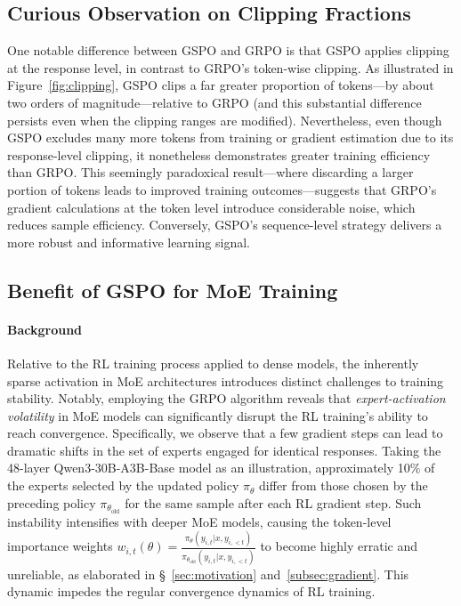 \subsection{Curious Observation on Clipping Fractions}

One notable difference between GSPO and GRPO is that GSPO applies clipping at the response level, in contrast to GRPO's token-wise clipping. As illustrated in Figure~\ref{fig:clipping}, GSPO clips a far greater proportion of tokens—by about two orders of magnitude—relative to GRPO (and this substantial difference persists even when the clipping ranges are modified). Nevertheless, even though GSPO excludes many more tokens from training or gradient estimation due to its response-level clipping, it nonetheless demonstrates greater training efficiency than GRPO. This seemingly paradoxical result—where discarding a larger portion of tokens leads to improved training outcomes—suggests that GRPO's gradient calculations at the token level introduce considerable noise, which reduces sample efficiency. Conversely, GSPO's sequence-level strategy delivers a more robust and informative learning signal.

\subsection{Benefit of GSPO for MoE Training}
\label{subsec:routing_replay}

\paragraph{Background}
Relative to the RL training process applied to dense models, the inherently sparse activation in MoE architectures introduces distinct challenges to training stability. Notably, employing the GRPO algorithm reveals that \textit{expert-activation volatility} in MoE models can significantly disrupt the RL training's ability to reach convergence. Specifically, we observe that a few gradient steps can lead to dramatic shifts in the set of experts engaged for identical responses. Taking the 48-layer Qwen3-30B-A3B-Base model as an illustration, approximately 10\% of the experts selected by the updated policy $\pi_{\theta}$ differ from those chosen by the preceding policy $\pi_{\theta_\text{old}}$ for the same sample after each RL gradient step. Such instability intensifies with deeper MoE models, causing the token-level importance weights $w_{i,t}(\theta) = \frac{ \pi_{\theta} (y_{i,t} | x, y_{i,<t}) }{ \pi_{\theta_\text{old}} (y_{i,t} | x,y_{i,<t})}$ to become highly erratic and unreliable, as elaborated in \S~\ref{sec:motivation} and~\ref{subsec:gradient}. This dynamic impedes the regular convergence dynamics of RL training.

